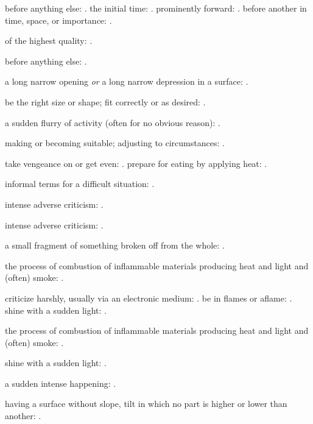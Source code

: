   before anything else: . the initial time: . prominently forward: . before another in time, space, or importance: .

  of the highest quality: .

  before anything else: .

  a long narrow opening \textit{or} a long narrow depression in a surface: .

  be the right size or shape; fit correctly or as desired: .

  a sudden flurry of activity (often for no obvious reason): .

  making or becoming suitable; adjusting to circumstances: .

  take vengeance on or get even: . prepare for eating by applying heat: .

  informal terms for a difficult situation: .

  intense adverse criticism: .

  intense adverse criticism: .

  a small fragment of something broken off from the whole: .

  the process of combustion of inflammable materials producing heat and light and (often) smoke: .

  criticize harshly, usually via an electronic medium: . be in flames or aflame: . shine with a sudden light: .

  the process of combustion of inflammable materials producing heat and light and (often) smoke: .

  shine with a sudden light: .

  a sudden intense happening: .

  having a surface without slope, tilt in which no part is higher or lower than another: .

